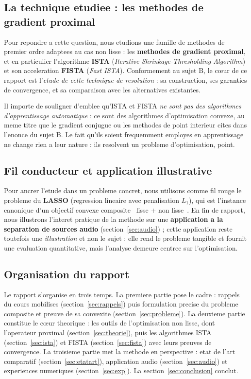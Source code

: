 \subsection{La technique etudiee : les methodes de gradient proximal}

Pour repondre a cette question, nous etudions une famille de methodes de
premier ordre adaptees au cas non lisse : les \textbf{methodes de gradient
proximal}, et en particulier l'algorithme \textbf{ISTA} (\emph{Iterative
Shrinkage-Thresholding Algorithm}) et son acceleration \textbf{FISTA}
(\emph{Fast ISTA}). Conformement au sujet B, le c\oe ur de ce rapport est
l'\emph{etude de cette technique de resolution} : sa construction, ses garanties
de convergence, et sa comparaison avec les alternatives existantes.

Il importe de souligner d'emblee qu'ISTA et FISTA \emph{ne sont pas des
algorithmes d'apprentissage automatique} : ce sont des algorithmes
d'optimisation convexe, au meme titre que le gradient conjugue ou les methodes
de point interieur cites dans l'enonce du sujet B. Le fait qu'ils soient
frequemment employes en apprentissage ne change rien a leur nature : ils
resolvent un probleme d'optimisation, point.

\subsection{Fil conducteur et application illustrative}

Pour ancrer l'etude dans un probleme concret, nous utilisons comme fil rouge le
probleme du \textbf{LASSO} (regression lineaire avec penalisation $L_1$), qui
est l'instance canonique d'un objectif convexe composite \guillemotleft{}~lisse $+$ non
lisse~\guillemotright{}. En fin de rapport, nous illustrons l'interet pratique de la methode
sur une \textbf{application a la separation de sources audio}
(section~\ref{sec:audio}) ; cette application reste toutefois une
\emph{illustration} et non le sujet : elle rend le probleme tangible et fournit
une evaluation quantitative, mais l'analyse demeure centree sur l'optimisation.

\subsection{Organisation du rapport}

Le rapport s'organise en trois temps. La premiere partie pose le cadre :
rappels du cours mobilises (section~\ref{sec:rappels}) puis formulation precise
du probleme composite et preuve de sa convexite (section~\ref{sec:probleme}).
La deuxieme partie constitue le c\oe ur theorique : les outils de l'optimisation
non lisse, dont l'operateur proximal (section~\ref{sec:theorie}), puis les
algorithmes ISTA (section~\ref{sec:ista}) et FISTA (section~\ref{sec:fista})
avec leurs preuves de convergence. La troisieme partie met la methode en
perspective : etat de l'art comparatif (section~\ref{sec:etatart}), application
audio (section~\ref{sec:audio}) et experiences numeriques
(section~\ref{sec:exp}). La section~\ref{sec:conclusion} conclut.
